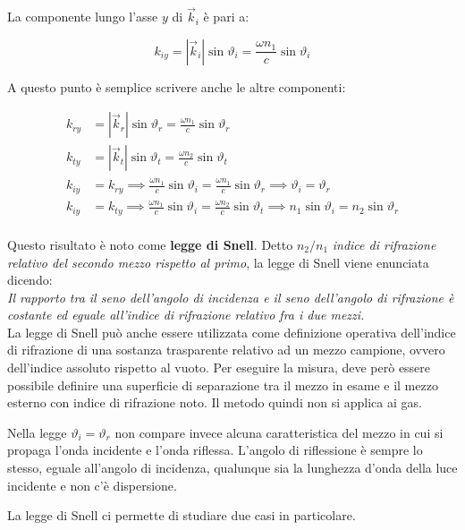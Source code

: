 La componente lungo l'asse $y$ di $\vec{k}_i$ è pari a:

\[
	k_{iy} = |\vec{k}_i |\sin \vartheta_i = \frac{\omega n_1}{c}\sin \vartheta_i
\]

A questo punto è semplice scrivere anche le altre componenti:

\begin{align*}
	k_{ry} &= |\vec{k}_r |\sin \vartheta_r = \frac{\omega n_1}{c}\sin \vartheta_r \\
	k_{ty} &= |\vec{k}_t |\sin \vartheta_t = \frac{\omega n_2}{c}\sin \vartheta_t \\
	k_{iy}&=k_{ry} \implies \frac{\omega n_1}{c}\sin \vartheta_i = \frac{\omega n_1}{c}\sin \vartheta_r \implies \boxed{\vartheta_i=\vartheta_r}\\
	k_{iy}&=k_{ty} \implies \frac{\omega n_1}{c}\sin \vartheta_i = \frac{\omega n_2}{c}\sin \vartheta_t \implies \boxed{n_1\sin  \vartheta_i=n_2\sin  \vartheta_r}\\
\end{align*}

Questo risultato è noto come \textbf{legge di Snell}.
Detto $n_2/n_1$ \emph{indice di rifrazione relativo del secondo mezzo rispetto al primo}, la legge di Snell viene enunciata dicendo:\\
\emph{Il rapporto tra il seno dell'angolo di incidenza e il seno dell'angolo di rifrazione è costante ed eguale all'indice di rifrazione relativo fra i due mezzi.}\\
La legge di Snell può anche essere utilizzata come definizione operativa dell'indice di rifrazione di una sostanza trasparente relativo ad un mezzo campione, ovvero dell'indice assoluto rispetto al vuoto. Per eseguire la misura, deve però essere possibile definire una superficie di separazione tra il mezzo in esame e il mezzo esterno con indice di rifrazione noto. Il metodo quindi non si applica ai gas.

Nella legge $\vartheta_i=\vartheta_r  $ non compare invece alcuna caratteristica del mezzo in cui si propaga l'onda incidente e l'onda riflessa. L'angolo di riflessione è sempre lo stesso, eguale all'angolo di incidenza, qualunque sia la lunghezza d'onda della luce incidente e non c'è dispersione.

La legge di Snell ci permette di studiare due casi in particolare.

